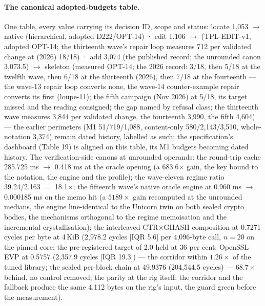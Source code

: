 \documentclass[10pt,a4paper]{article}
\begin{document}
\paragraph{The canonical adopted-budgets table.} One table, every value carrying its decision ID, scope and status: locate 1{,}053 $\to$ \gabaritLocaliserApres{} native (hierarchical, adopted D222/OPT-14) · edit 1{,}106 $\to$ \gabaritEditerApres{} (TPL-EDIT-v1, adopted OPT-14; the thirteenth wave's repair loop measures 712 per validated change at (2026) 18/18) · add 3{,}074 (the published record; the unrounded canon 3{,}073.5) $\to$ \gabaritAjouterApres{} skeleton (measured OPT-14; the 2026 record: 3/18, then 5/18 at the twelfth wave, then 6/18 at the thirteenth (2026), then 7/18 at the fourteenth --- the wave-13 repair loop converts none, the wave-14 counter-example repair converts its first (loupe-11); the fifth campaign (Nov 2026) at 5/18, its target missed and the reading consigned; the gap named by refusal class; the thirteenth wave measures 3{,}844 per validated change, the fourteenth 3{,}990, the fifth 4{,}604) --- the earlier perimeters (M1 51/719/1{,}088, content-only 580/2{,}143/3{,}510, whole-notation 3{,}374) remain dated history, labelled as such; the specification's dashboard (Table 19) is aligned on this table, its M1 budgets becoming dated history. The verification-side canons at unrounded operands: the round-trip cache 285.725 ms $\to$ 0.418 ms at the oracle opening (a 683.6$\times$ gain, the key bound to the notation, the engine and the profile); the wave-eleven regime ratio 39.24/2.163 $=$ 18.1$\times$; the fifteenth wave's native oracle engine at 0.960 ms $\to$ 0.000185 ms on the memo hit (a $5189\times$ gain recomputed at the unrounded medians, the engine line-identical to the Unicorn twin on both sealed crypto bodies, the mechanisms orthogonal to the regime memoisation and the incremental crystallisation); the interleaved CTR$\times$GHASH composition at 0.7271 cycles per byte at 4\,KiB (2{,}978.2 cycles [IQR 5.6] per 4{,}096-byte call, $n{=}20$ on the pinned core; the pre-registered target of 2.0 held at 36 per cent; OpenSSL EVP at 0.5757 (2{,}357.9 cycles [IQR 19.3]) --- the corridor within $1.26\times$ of the tuned library; the sealed per-block chain at 49.9376 (204{,}544.5 cycles) --- $68.7\times$ behind, no control removed; the parity at the rig itself: the corridor and the fallback produce the same 4{,}112 bytes on the rig's input, the guard green before the measurement).
\end{document}

